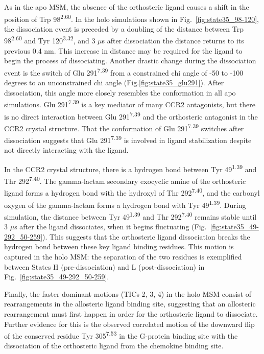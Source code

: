 As in the apo MSM, the absence of the orthosteric ligand causes a shift in the position of Trp 98\textsuperscript{2.60}.
In the holo simulations shown in Fig.~\ref{fig:state35_98-120}, the dissociation event is preceded by a doubling of the distance between Trp 98\textsuperscript{2.60} and Tyr 120\textsuperscript{3.32}, and 3 $\mu$s after dissociation the distance returns to its previous 0.4 nm.
This increase in distance may be required for the ligand to begin the process of dissociating.
Another drastic change during the dissociation event is the switch of Glu 291\textsuperscript{7.39} from a constrained chi angle of -50 to -100 degrees to an unconstrained chi angle (Fig.\ref{fig:state35_glu291}).
After dissociation, this angle more closely resembles the conformation in all apo simulations.
Glu 291\textsuperscript{7.39} is a key mediator of many CCR2 antagonists\cite{Cherney2008}, but there is no direct interaction between Glu 291\textsuperscript{7.39} and the orthosteric antagonist in the CCR2 crystal structure\cite{Qin2015}.
That the conformation of Glu 291\textsuperscript{7.39} switches after dissociation suggests that Glu 291\textsuperscript{7.39} is involved in ligand stabilization despite not directly interacting with the ligand.

In the CCR2 crystal structure, there is a hydrogen bond between Tyr 49\textsuperscript{1.39} and Thr 292\textsuperscript{7.40}.
The gamma-lactam secondary exocyclic amine of the orthosteric ligand forms a hydrogen bond with the hydroxyl of Thr 292\textsuperscript{7.40}, and the carbonyl oxygen of the gamma-lactam forms a hydrogen bond with Tyr 49\textsuperscript{1.39}.
During simulation, the distance between Tyr 49\textsuperscript{1.39} and Thr 292\textsuperscript{7.40} remains stable until 3 $\mu$s after the ligand dissociates, when it begins fluctuating (Fig.~\ref{fig:state35_49-292_50-259}).
This suggests that the orthosteric ligand dissociation breaks the hydrogen bond between these key ligand binding residues.
This motion is captured in the holo MSM: the separation of the two residues is exemplified between States H (pre-dissociation) and L (post-dissociation) in Fig.~\ref{fig:state35_49-292_50-259}.

Finally, the faster dominant motions (TICs 2, 3, 4) in the holo MSM consist of rearrangements in the allosteric ligand binding site, suggesting that an allosteric rearrangement must first happen in order for the orthosteric ligand to dissociate.
Further evidence for this is the observed correlated motion of the downward flip of the conserved residue Tyr 305\textsuperscript{7.53} in the G-protein binding site with the dissociation of the orthosteric ligand from the chemokine binding site.


